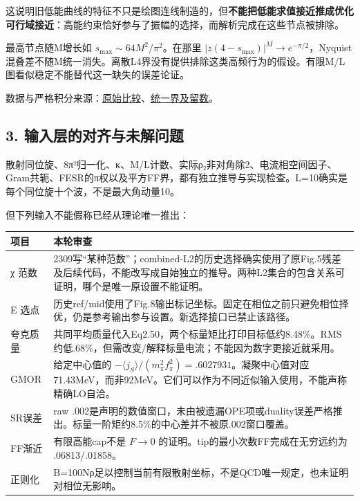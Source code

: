 \documentclass[
  11pt,
  a4paper,
]{article}
\newcounter{none} %
\begin{document}
这说明旧低能曲线的特征不只是绘图连线制造的，但\textbf{不能把低能求值接近推成优化可行域接近}：高能约束恰好参与了振幅的选择，而解析完成在这些节点被排除。

最高节点随M增长如 \(s_{\max}\sim64M^2/\pi^2\)。在那里
\(|z(4-s_{\max})|^M\to e^{-\pi/2}\)，Nyquist
混叠差不随M统一消失。离散L4界没有提供排除这类高频行为的假设。有限M/L图看似稳定不能替代这一缺失的误差论证。

数据与严格积分来源：\href{analytic_comparison/analytic_audit.json}{原始比较}、\href{verified_analytic_audit/analytic_audit.json}{统一界及留数}。

\subsection{3.
输入层的对齐与未解问题}\label{ux8f93ux5165ux5c42ux7684ux5bf9ux9f50ux4e0eux672aux89e3ux95eeux9898}

散射同位旋、8π²归一化、κ、M/L计数、实际ρ₂非对角除2、电流相空间因子、Gram共轭、FESR的π权以及平方FF界，都有独立推导与实现检查。L=10确实是每个同位旋十个波，不是最大角动量10。

但下列输入不能假称已经从理论唯一推出：

{\def\LTcaptype{none} %
\begin{longtable}[]{@{}
  >{\raggedright\arraybackslash}p{}
  >{\raggedright\arraybackslash}p{}@{}}
\toprule\noalign{}
\begin{minipage}[b]{\linewidth}\raggedright
项目
\end{minipage} & \begin{minipage}[b]{\linewidth}\raggedright
本轮审查
\end{minipage} \\
\midrule\noalign{}
\endhead
\bottomrule\noalign{}
\endlastfoot
χ 范数 &
2309写``某种范数''；combined-L2的历史选择确实使用了原Fig.5残差及后续代码，不能改写成自始独立的推导。两种L2集合的包含关系可证明，哪个是唯一原设置不能证明。 \\
E 选点 &
历史ref/mid使用了Fig.8输出标记坐标。固定在相位之前只避免相位择优，仍是参考输出参与设置。新选择接口已禁止该路径。 \\
夸克质量 &
共同平均质量代入Eq2.50，两个标量矩比打印目标低约8.48\%。RMS约低.68\%，但需改变/解释标量电流；不能因为数字更接近就采用。 \\
GMOR & 给定中心值的
\(-\langle j_S\rangle/(m_\pi^2f_\pi^2)=.6027931\)。凝聚中心值对应71.43MeV，而非92MeV。它们可以作为不同近似输入使用，不能声称精确LO自洽。 \\
SR误差 & raw
.002是声明的数值窗口，未由被遗漏OPE项或duality误差严格推出。标量一阶矩约8.5\%的中心差并不被原.002窗口覆盖。 \\
FF渐近 & 有限高能cap不是 \(F\to0\)
的证明。tip的最小次数FF完成在无穷远约为 .06813/.01858。 \\
正则化 &
B=100Nρ足以控制当前有限散射坐标，不是QCD唯一规定，也未证明对相位无影响。 \\
\end{longtable}
}
\end{document}
